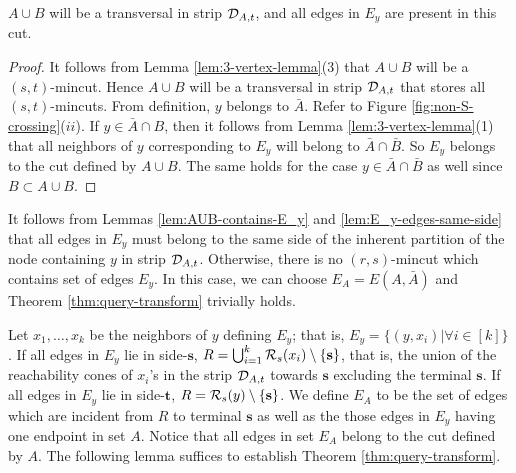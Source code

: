 \begin{lemma}
$A\cup B$ will be a transversal in strip ${\cal D}_{A,t}$, and all edges in $E_y$ are present in this cut.

\label{lem:AUB-contains-E_y}
\end{lemma}
\begin{proof}
It follows from Lemma \ref{lem:3-vertex-lemma}(3) that $A\cup B$ will be a $(s,t)$-mincut. Hence $A\cup B$ will be a transversal in strip ${\cal D}_{A,t}$ that stores all
$(s,t)$-mincuts.
From definition, $y$ belongs to $\bar{A}$. Refer to Figure \ref{fig:non-S-crossing}($ii$).  If $y\in \bar{A}\cap B$, then it follows from Lemma \ref{lem:3-vertex-lemma}(1) that all neighbors of $y$ corresponding to $E_y$ will belong to $\bar{A}\cap \bar{B}$. So $E_y$ belongs to the cut defined by $A\cup B$. The same holds for the case $y\in \bar{A}\cap\bar{B}$ as well since $B\subset A\cup B$.
\end{proof}

It follows from Lemmas \ref{lem:AUB-contains-E_y} and \ref{lem:E_y-edges-same-side} that all edges in $E_y$ must belong to the same side of the inherent partition of the node containing $y$ in strip ${\cal D}_{A,t}$. 
Otherwise, there is no $(r,s)$-mincut which contains set of edges $E_y$. In this case, we can choose $E_A = E(A,{\bar A})$ and Theorem \ref{thm:query-transform} trivially holds.

Let $x_1,\ldots,x_k$ be the neighbors of $y$ defining $E_y$; that is, $E_y = \{(y,x_i)|
\forall i\in [k]\}$. 
If all edges in $E_y$ lie in side-$\mathbf{s}$,
$R=\bigcup_{i=1}^{k}{\cal R}_s(x_i) \setminus \{\mathbf{s}\}$, that is, the union of the reachability cones of $x_i$'s in the strip ${\cal D}_{A,t}$ towards $\mathbf{s}$ excluding the terminal ${\mathbf{s}}$. If all edges in $E_y$ lie in side-$\mathbf{t}$,
$R={\cal R}_s(y) \setminus \{\mathbf{s}\}$.
We define $E_A$ to be the set of edges which are incident from $R$ to terminal $\mathbf{s}$ as well as the those edges in $E_y$ having one endpoint in set $A$. Notice that all edges in set $E_A$
belong to the cut defined by $A$. The following lemma suffices to establish Theorem  \ref{thm:query-transform}.

